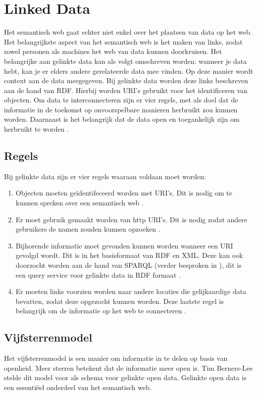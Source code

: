 \section{Linked Data}
\label{sec:linked_data}

Het semantisch web gaat echter niet enkel over het plaatsen van data op het web. Het belangrijkste aspect van het semantisch web is het maken van links, zodat zowel personen als machines het web van data kunnen doorkruisen. Het belangrijke aan gelinkte data kan als volgt omschreven worden: wanneer je data hebt, kan je er elders andere gerelateerde data mee vinden. Op deze manier wordt context aan de data meegegeven. Bij gelinkte data worden deze links beschreven aan de hand van RDF. Hierbij worden URI's gebruikt voor het identificeren van objecten. Om data te interconnecteren zijn er vier regels, met als doel dat de informatie in de toekomst op onvoorspelbare manieren herbruikt zou kunnen worden. Daarnaast is het belangrijk dat de data open en toegankelijk zijn om herbruikt te worden \cite{berners2006linkeddata}. 

\subsection{Regels}
Bij gelinkte data zijn er vier regels waaraan voldaan moet worden:
\begin{enumerate}
    \item Objecten moeten geïdentifeceerd worden met URI's. Dit is nodig om te kunnen spreken over een semantisch web \cite{berners2006linkeddata}. 
    \item Er moet gebruik gemaakt worden van \acrfull{http} URI's. Dit is nodig zodat andere gebruikers de namen zouden kunnen opzoeken \cite{berners2006linkeddata}. 
    \item Bijhorende informatie moet gevonden kunnen worden wanneer een URI gevolgd wordt. Dit is in het basisformaat van RDF en XML. Deze kan ook doorzocht worden aan de hand van SPARQL (verder besproken in ), dit is een query service voor gelinkte data in RDF formaat \cite{berners2006linkeddata}. 
    \item Er moeten links voorzien worden naar andere locaties die gelijkaardige data bevatten, zodat deze opgezocht kunnen worden. Deze laatste regel is belangrijk om de informatie op het web te connecteren \cite{berners2006linkeddata}.
\end{enumerate}

\subsection{Vijfsterrenmodel}
Het vijfsterrenmodel is een manier om informatie in te delen op basis van openheid. Meer sterren betekent dat de informatie meer open is. Tim Berners-Lee stelde dit model voor als schema voor gelinkte open data. Gelinkte open data is een essentiëel onderdeel van het semantisch web.

